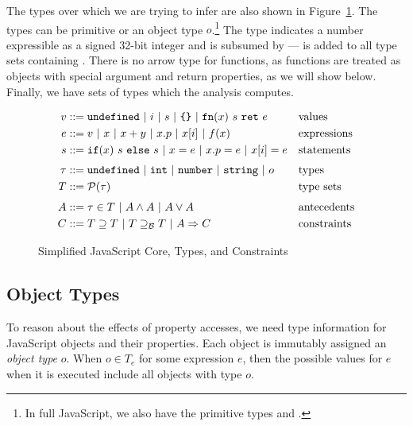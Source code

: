 The types over which we are trying to infer are also shown in
Figure~\ref{fig:js-core}. The types can be primitive or an object type
$o$.\footnote{In full JavaScript, we also have the primitive types 
  and .} The  type indicates a number expressible as a
signed 32-bit integer and is subsumed by  ---  is added
to all type sets containing . There is no arrow type for
functions, as functions are treated as objects with special argument and
return properties, as we will show below. Finally, we have sets of types
which the analysis computes.

\newcommand{\barrier}{\supseteq_\mathcal{B}}

\begin{figure}
\begin{align*}
v & ::= \code{undefined}\ |\ i\ |\ s\ |\ \text{\code{\{\}}}\ |\ \code{fn}(x)\ s\ \code{ret}\ e&& \text{values}\\
e & ::= v\ |\ x\ |\ x + y\ |\ x.p\ |\ x[i]\ |\ f(x) && \text{expressions}\\
s & ::= \code{if}(x)\ s\ \code{else}\ s\ |\ x = e\ |\ x.p = e\ |\ x[i] = e && \text{statements}\\[0.7ex]
\tau & ::= \code{undefined}\ |\ \code{int}\ |\ \code{number}\ |\ \code{string}\ |\ o && \text{types}\\
T & ::= \mathcal{P}(\tau) && \text{type sets}\\[0.8ex]
A & ::= \tau \in T\ |\ A \wedge A\ |\ A \vee A && \text{antecedents}\\
C & ::= T \supseteq T\ |\ T \barrier T\ |\ A \Implies C && \text{constraints}
\end{align*}
\caption{Simplified JavaScript Core, Types, and Constraints}
\label{fig:js-core}
\end{figure}



\subsection{Object Types}
\label{sec:object-types}

To reason about the effects of property accesses, we need type information
for JavaScript objects and their properties.
Each object is immutably assigned an {\it object type} $o$.
When $o \in T_e$ for some expression $e$, then the possible values
for $e$ when it is executed include all objects with type $o$.

